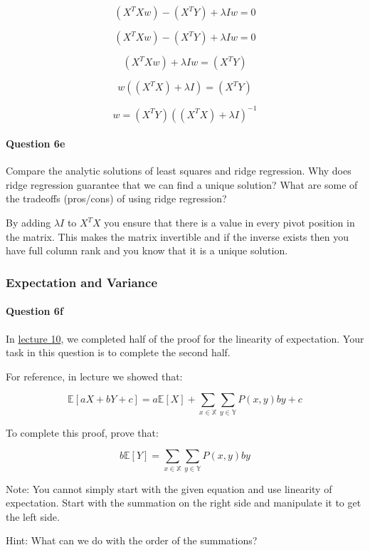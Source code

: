 \documentclass[11pt]{article}
\begin{document}
\[(X^TXw) - (X^TY) +  \lambda Iw= 0\]

\[(X^TXw) - (X^TY) +  \lambda Iw= 0\]

\[(X^TXw)  +  \lambda Iw= (X^TY)\]

\[w((X^TX)  +  \lambda I)= (X^TY)\]

\[w = (X^TY)((X^TX)  +  \lambda I)^{-1}\]

    \paragraph{Question 6e}\label{question-6e}

Compare the analytic solutions of least squares and ridge regression.
Why does ridge regression guarantee that we can find a unique solution?
What are some of the tradeoffs (pros/cons) of using ridge regression?

    By adding \(\lambda I\) to \(X^TX\) you ensure that there is a value in
every pivot position in the matrix. This makes the matrix invertible and
if the inverse exists then you have full column rank and you know that
it is a unique solution.

    \subsubsection{Expectation and Variance}\label{expectation-and-variance}

\paragraph{Question 6f}\label{question-6f}

In \href{http://www.ds100.org/fa18/syllabus\#lecture-week-6}{lecture
10}, we completed half of the proof for the linearity of expectation.
Your task in this question is to complete the second half.

For reference, in lecture we showed that:

\[\mathbb{E}[aX + bY + c] = a\mathbb{E}[X] + \sum_{x \in \mathbb{X}}\sum_{y \in \mathbb{Y}}P(x, y)by + c\]

To complete this proof, prove that:

\[b\mathbb{E}[Y] = \sum_{x \in \mathbb{X}}\sum_{y \in \mathbb{Y}}P(x, y)by\]

Note: You cannot simply start with the given equation and use linearity
of expectation. Start with the summation on the right side and
manipulate it to get the left side.

Hint: What can we do with the order of the summations?
\end{document}
